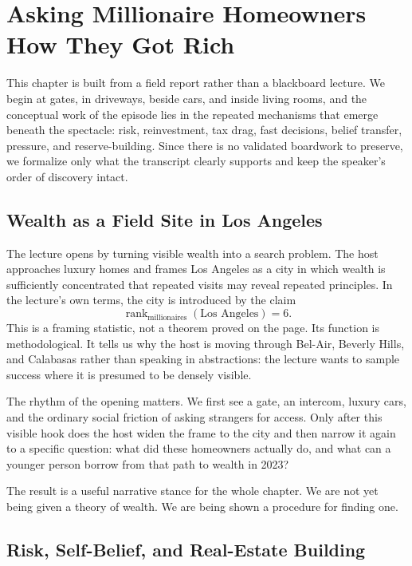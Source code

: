 \chapter{Asking Millionaire Homeowners How They Got Rich}

This chapter is built from a field report rather than a blackboard lecture. We begin at gates, in driveways, beside cars, and inside living rooms, and the conceptual work of the episode lies in the repeated mechanisms that emerge beneath the spectacle: risk, reinvestment, tax drag, fast decisions, belief transfer, pressure, and reserve-building. Since there is no validated boardwork to preserve, we formalize only what the transcript clearly supports and keep the speaker's order of discovery intact.

\section{Wealth as a Field Site in Los Angeles}

The lecture opens by turning visible wealth into a search problem. The host approaches luxury homes and frames Los Angeles as a city in which wealth is sufficiently concentrated that repeated visits may reveal repeated principles. In the lecture's own terms, the city is introduced by the claim
\begin{equation}
\operatorname{rank}_{\text{millionaires}}(\text{Los Angeles}) = 6.
\end{equation}
This is a framing statistic, not a theorem proved on the page. Its function is methodological. It tells us why the host is moving through Bel-Air, Beverly Hills, and Calabasas rather than speaking in abstractions: the lecture wants to sample success where it is presumed to be densely visible.

The rhythm of the opening matters. We first see a gate, an intercom, luxury cars, and the ordinary social friction of asking strangers for access. Only after this visible hook does the host widen the frame to the city and then narrow it again to a specific question: what did these homeowners actually do, and what can a younger person borrow from that path to wealth in 2023?

The result is a useful narrative stance for the whole chapter. We are not yet being given a theory of wealth. We are being shown a procedure for finding one.

\section{Risk, Self-Belief, and Real-Estate Building}

